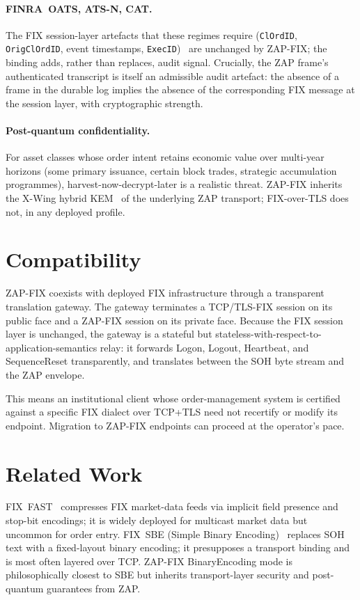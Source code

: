 \documentclass[11pt,a4paper]{article}
\begin{document}
\paragraph{FINRA~OATS, ATS-N, CAT.}
The FIX session-layer artefacts that these regimes require
(\texttt{ClOrdID}, \texttt{OrigClOrdID}, event timestamps,
\texttt{ExecID})~\cite{finra-oats,finra-cat} are unchanged by
ZAP-FIX; the binding adds, rather than replaces, audit signal.
Crucially, the ZAP frame's authenticated transcript is itself an
admissible audit artefact: the absence of a frame in the durable
log implies the absence of the corresponding FIX message at the
session layer, with cryptographic strength.

\paragraph{Post-quantum confidentiality.}
For asset classes whose order intent retains economic value over
multi-year horizons (some primary issuance, certain block trades,
strategic accumulation programmes), harvest-now-decrypt-later is a
realistic threat. ZAP-FIX inherits the X-Wing hybrid KEM~\cite{xwing}
of the underlying ZAP transport; FIX-over-TLS does not, in any
deployed profile.

\section{Compatibility}
\label{sec:compat}

ZAP-FIX coexists with deployed FIX infrastructure through a
transparent translation gateway. The gateway terminates a TCP/TLS-FIX
session on its public face and a ZAP-FIX session on its private
face. Because the FIX session layer is unchanged, the gateway is a
stateful but stateless-with-respect-to-application-semantics relay:
it forwards Logon, Logout, Heartbeat, and SequenceReset transparently,
and translates between the SOH byte stream and the ZAP envelope.

This means an institutional client whose order-management system is
certified against a specific FIX dialect over TCP+TLS need not
recertify or modify its endpoint. Migration to ZAP-FIX endpoints can
proceed at the operator's pace.

\section{Related Work}
\label{sec:related}

FIX~FAST~\cite{fixfast} compresses FIX market-data feeds via implicit
field presence and stop-bit encodings; it is widely deployed for
multicast market data but uncommon for order entry. FIX~SBE
(Simple Binary Encoding)~\cite{fixsbe} replaces SOH text with a
fixed-layout binary encoding; it presupposes a transport binding
and is most often layered over TCP. ZAP-FIX BinaryEncoding mode is
philosophically closest to SBE but inherits transport-layer security
and post-quantum guarantees from ZAP.
\end{document}
